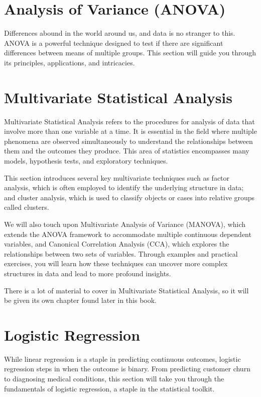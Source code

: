 \documentclass{book}
\begin{document}
\section{Analysis of Variance (ANOVA)}
Differences abound in the world around us, and data is no stranger to this. ANOVA is a powerful technique designed to test if there are significant differences between means of multiple groups. This section will guide you through its principles, applications, and intricacies.

\section{Multivariate Statistical Analysis}
Multivariate Statistical Analysis refers to the procedures for analysis of data that involve more than one variable at a time. It is essential in the field where multiple phenomena are observed simultaneously to understand the relationships between them and the outcomes they produce. This area of statistics encompasses many models, hypothesis tests, and exploratory techniques.

This section introduces several key multivariate techniques such as factor analysis, which is often employed to identify the underlying structure in data; and cluster analysis, which is used to classify objects or cases into relative groups called clusters.

We will also touch upon Multivariate Analysis of Variance (MANOVA), which extends the ANOVA framework to accommodate multiple continuous dependent variables, and Canonical Correlation Analysis (CCA), which explores the relationships between two sets of variables. Through examples and practical exercises, you will learn how these techniques can uncover more complex structures in data and lead to more profound insights.

There is a lot of material to cover in Multivariate Statistical Analysis, so it will be given its own chapter found later in this book.

\section{Logistic Regression}
While linear regression is a staple in predicting continuous outcomes, logistic regression steps in when the outcome is binary. From predicting customer churn to diagnosing medical conditions, this section will take you through the fundamentals of logistic regression, a staple in the statistical toolkit.
\end{document}
